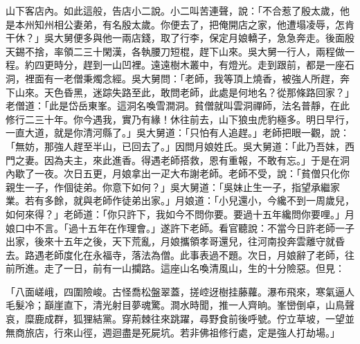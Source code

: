 山下客店內。如此這般，告店小二說。小二叫苦連聲，說：「不合惹了殷太歲，他是本州知州相公妻弟，有名殷太歲。你便去了，把俺開店之家，他遭塌凌辱，怎肯干休？」吳大舅便多與他一兩店錢，取了行李，保定月娘轎子，急急奔走。後面殷天錫不捨，率領二三十閑漢，各執腰刀短棍，趕下山來。吳大舅一行人，兩程做一程。約四更時分，趕到一山凹裡。遠遠樹木叢中，有燈光。走到跟前，都是一座石洞，裡面有一老僧秉燭念經。吳大舅問：「老師，我等頂上燒香，被強人所趕，奔下山來。天色昏黑，迷踪失路至此，敢問老師，此處是何地名？從那條路回家？」老僧道：「此是岱岳東峯。這洞名喚雪澗洞。貧僧就叫雲洞禪師，法名普靜，在此修行二三十年。你今遇我，實乃有緣！休往前去，山下狼虫虎豹極多。明日早行，一直大道，就是你清河縣了。」吳大舅道：「只怕有人追趕。」老師把眼一觀，說：「無妨，那強人趕至半山，已回去了。」因問月娘姓氏。吳大舅道：「此乃吾妹，西門之妻。因為夫主，來此進香。得遇老師搭救，恩有重報，不敢有忘。」于是在洞內歇了一夜。次日五更，月娘拿出一疋大布謝老師。老師不受，說：「貧僧只化你親生一子，作個徒弟。你意下如何？」吳大舅道：「吳妹止生一子，指望承繼家業。若有多餘，就與老師作徒弟出家。」月娘道：「小兒還小，今纔不到一周歲兒，如何來得？」老師道：「你只許下，我如今不問你要。要過十五年纔問你要哩。」月娘口中不言。「過十五年在作理會。」遂許下老師。看官聽說：不當今日許老師一子出家，後來十五年之後，天下荒亂，月娘攜領孝哥還兒，往河南投奔雲離守就昏去。路遇老師度化在永福寺，落法為僧。此事表過不題。次日，月娘辭了老師，往前所進。走了一日，前有一山攔路。這座山名喚清風山，生的十分險惡。但見：

「八面嵯峨，四圍險峻。古怪喬松盤翠蓋，搓崆迓樹挂藤蘿。瀑布飛來，寒氣逼人毛髮冷；巔崖直下，清光射目夢魂驚。澗水時聞，推一人齊晌。峯巒倒卓，山鳥聲哀，糜鹿成群，狐狸結黨。穿荊棘往來跳躍，尋野食前後呼號。佇立草坡，一望並無商旅店，行來山徑，週迴盡是死屍坑。若非佛祖修行處，定是強人打劫場。」

